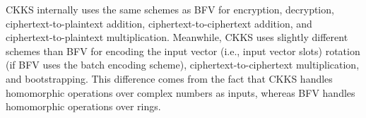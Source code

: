 CKKS internally uses the same schemes as BFV for encryption, decryption, ciphertext-to-plaintext addition, ciphertext-to-ciphertext addition, and ciphertext-to-plaintext multiplication. Meanwhile, CKKS uses slightly different schemes than BFV for encoding the input vector (i.e., input vector slots) rotation (if BFV uses the batch encoding scheme), ciphertext-to-ciphertext multiplication, and bootstrapping. This difference comes from the fact that CKKS handles homomorphic operations over complex numbers as inputs, whereas BFV handles homomorphic operations over rings. 



\begin{tcolorbox}[
    title = \textbf{Required Background},    %
    colback = white,    %
    colframe = black,  %
    boxrule = 0.8pt,     %
    left = 1mm, right = 1mm, top = 1mm, bottom = 1mm %
]


\end{tcolorbox}
